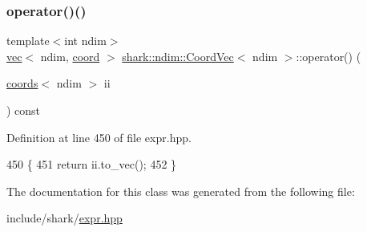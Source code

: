 \subsubsection{\texorpdfstring{operator()()}{operator()()}}
{\footnotesize\ttfamily template$<$int ndim$>$ \\
\hyperlink{structshark_1_1ndim_1_1vec}{vec}$<$ ndim, \hyperlink{namespaceshark_a767a92d5dd82cb82266473bff42fa6d9}{coord} $>$ \hyperlink{classshark_1_1ndim_1_1_coord_vec}{shark\+::ndim\+::\+Coord\+Vec}$<$ ndim $>$\+::operator() (\begin{DoxyParamCaption}\item[{\hyperlink{structshark_1_1ndim_1_1coords}{coords}$<$ ndim $>$}]{ii }\end{DoxyParamCaption}) const\hspace{0.3cm}{\ttfamily [inline]}}



Definition at line 450 of file expr.\+hpp.


\begin{DoxyCode}
450                                                                                \{
451             \textcolor{keywordflow}{return} ii.to\_vec();
452         \}
\end{DoxyCode}


The documentation for this class was generated from the following file\+:\begin{DoxyCompactItemize}
\item 
include/shark/\hyperlink{expr_8hpp}{expr.\+hpp}\end{DoxyCompactItemize}
